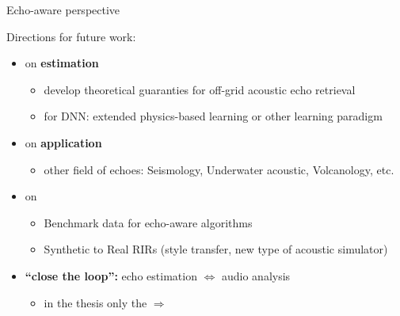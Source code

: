\begin{frame}{Echo-aware perspective}

    Directions for future work:
    \pause

    \begin{itemize}
        \item[\mytriag] on \textbf{estimation}
        \begin{itemize}\small
            \item develop theoretical guaranties for off-grid acoustic echo retrieval
            \item for DNN: extended physics-based learning or other learning paradigm
        \end{itemize}

        \vfill
        \pause
        \item[\mytriag] on \textbf{application}
        \begin{itemize}
            \item other field of echoes: Seismology, Underwater acoustic, Volcanology, etc.
        \end{itemize}

        \vfill
        \pause
        \item[\mytriag] on \dechorate
        \begin{itemize}
            \item Benchmark data for echo-aware algorithms
            \item Synthetic to Real RIRs (style transfer, new type of acoustic simulator)
        \end{itemize}

        \vfill
        \pause
        \item[\mytriag] \textbf{``close the loop'':}  echo estimation $\Leftrightarrow$ audio analysis
        \begin{itemize}
            \item in the thesis only the $\Rightarrow$
        \end{itemize}
    \end{itemize}

\end{frame}



